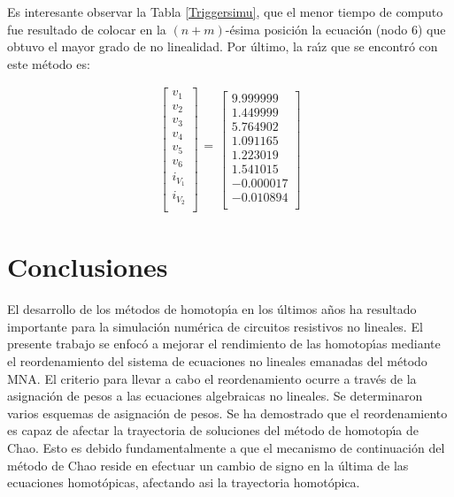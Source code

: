 \documentclass[conference,letterpaper,onecolumn]{IEEEtran}
\begin{document}
Es interesante observar la Tabla \ref{Triggersimu}, que el menor tiempo de
computo fue resultado de colocar en la $(n+m)$-\'esima posici\'on
la ecuaci\'on (nodo 6)  que obtuvo el mayor grado de no linealidad. 
Por \'ultimo, la ra\'{\i}z que se encontr\'o con este m\'etodo es:

\begin{displaymath}
\begin{array}{r}
\left[\begin{array}{r}
v_1 \\ v_2  \\ v_3  \\ v_4 \\ v_5  \\ v_6  \\
i_{V_1}  \\ i_{V_2}  \\ 
\end{array}\right]
\begin{array}{r}
 \\
= \\
  \\
\end{array}
\left[\begin{array}{r}
 9.999999\\ 1.449999 \\ 5.764902\\ 1.091165\\ 1.223019\\ 1.541015\\
 -0.000017\\ -0.010894\\
\end{array}\right]
\end{array}
\end{displaymath}

\section{Conclusiones}

El desarrollo de los m\'etodos de homotop\'{\i}a en los \'ultimos a\~nos
ha resultado importante para la simulaci\'on num\'erica de
circuitos resistivos no lineales.
El presente trabajo  se enfoc\'o a mejorar el rendimiento de las
homotop\'{\i}as mediante el reordenamiento del sistema de ecuaciones no
lineales emanadas del m\'etodo MNA.
El criterio para llevar a cabo el reordenamiento ocurre a trav\'es de la
asignaci\'on de pesos a las ecuaciones algebraicas no lineales.
Se determinaron varios esquemas de asignaci\'on de pesos.
Se ha demostrado que el reordenamiento es capaz de afectar la trayectoria
de soluciones del m\'etodo de homotop\'{\i}a de Chao.
Esto es debido fundamentalmente a que el mecanismo de continuaci\'on del
m\'etodo de Chao reside en efectuar un cambio de signo en la \'ultima de las ecuaciones homot\'opicas, afectando asi la trayectoria homot\'opica.





\end{document}
